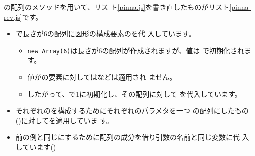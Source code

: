 \JS の配列のメソッドを用いて、\JS リス
ト\ref{pinna.js}を書き直したものが\JS リスト\ref{pinna-rev.js}です。

\begin{itemize}
 \item {}で長さが6の配列に図形の構成要素のを代
			 入しています。
			 \begin{itemize}
				\item \Verb+new Array(6)+は長さが6の配列が作成されますが、値は
							で初期化されます。
				\item 値がの要素に対してはなどは適用され
							ません。
				\item したがって、で1に初期化し、その配列に対して
							を代入しています。
			 \end{itemize}
 \item それぞれのを構成するためにそれぞれのパラメタを一つ
			 の配列にしたもの
			 ()に対してを適用していま
			 す。
 \item 前の例と同じにするために配列の成分を借り引数の名前と同じ変数に代
			 入しています()
\end{itemize}
